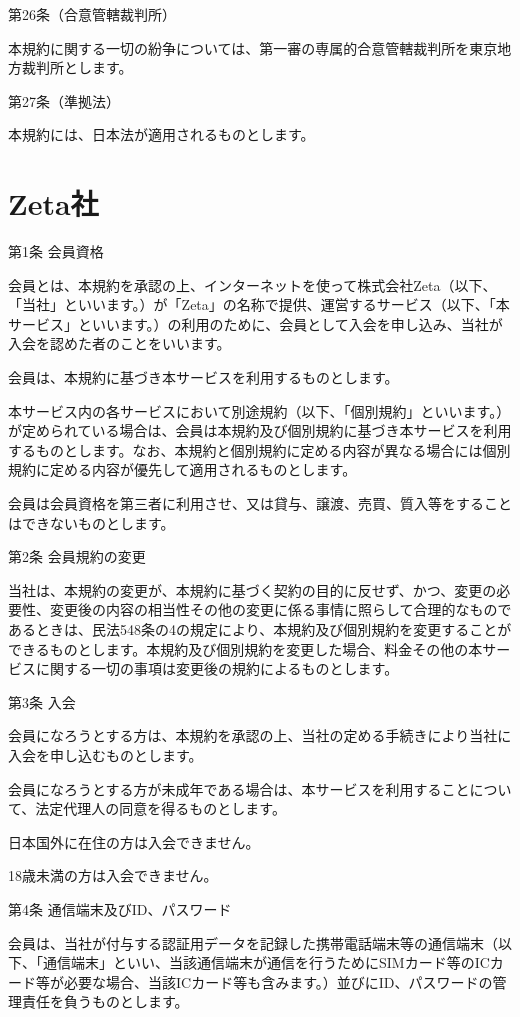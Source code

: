 第26条（合意管轄裁判所）

    本規約に関する一切の紛争については、第一審の専属的合意管轄裁判所を東京地方裁判所とします。

第27条（準拠法）

    本規約には、日本法が適用されるものとします。

\section{Zeta社}
第1条 会員資格

    会員とは、本規約を承認の上、インターネットを使って株式会社Zeta（以下、「当社」といいます。）が「Zeta」の名称で提供、運営するサービス（以下、「本サービス」といいます。）の利用のために、会員として入会を申し込み、当社が入会を認めた者のことをいいます。

    会員は、本規約に基づき本サービスを利用するものとします。

    本サービス内の各サービスにおいて別途規約（以下、「個別規約」といいます。）が定められている場合は、会員は本規約及び個別規約に基づき本サービスを利用するものとします。なお、本規約と個別規約に定める内容が異なる場合には個別規約に定める内容が優先して適用されるものとします。

    会員は会員資格を第三者に利用させ、又は貸与、譲渡、売買、質入等をすることはできないものとします。

第2条 会員規約の変更

    当社は、本規約の変更が、本規約に基づく契約の目的に反せず、かつ、変更の必要性、変更後の内容の相当性その他の変更に係る事情に照らして合理的なものであるときは、民法548条の4の規定により、本規約及び個別規約を変更することができるものとします。本規約及び個別規約を変更した場合、料金その他の本サービスに関する一切の事項は変更後の規約によるものとします。

第3条 入会

    会員になろうとする方は、本規約を承認の上、当社の定める手続きにより当社に入会を申し込むものとします。

    会員になろうとする方が未成年である場合は、本サービスを利用することについて、法定代理人の同意を得るものとします。

    日本国外に在住の方は入会できません。

    18歳未満の方は入会できません。

第4条 通信端末及びID、パスワード

    会員は、当社が付与する認証用データを記録した携帯電話端末等の通信端末（以下、「通信端末」といい、当該通信端末が通信を行うためにSIMカード等のICカード等が必要な場合、当該ICカード等も含みます。）並びにID、パスワードの管理責任を負うものとします。

